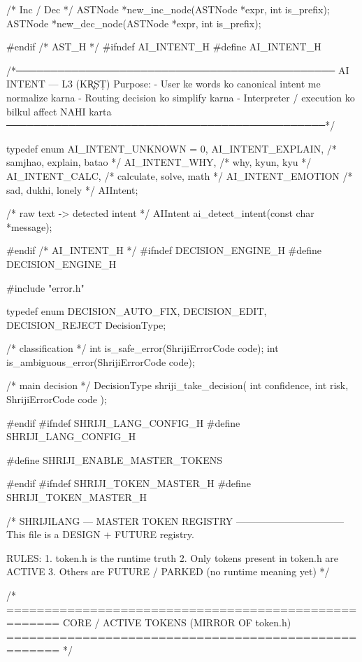 \documentclass{article}
\begin{document}
/* Inc / Dec */
ASTNode *new_inc_node(ASTNode *expr, int is_prefix);
ASTNode *new_dec_node(ASTNode *expr, int is_prefix);

#endif /* AST_H */
#ifndef AI_INTENT_H
#define AI_INTENT_H

/*──────────────────────────────────────────────
  AI INTENT — L3 (KR̥ṢṬ)
  Purpose:
  - User ke words ko canonical intent me normalize karna
  - Routing decision ko simplify karna
  - Interpreter / execution ko bilkul affect NAHI karta
──────────────────────────────────────────────*/

typedef enum {
    AI_INTENT_UNKNOWN = 0,
    AI_INTENT_EXPLAIN,   /* samjhao, explain, batao */
    AI_INTENT_WHY,       /* why, kyun, kyu */
    AI_INTENT_CALC,      /* calculate, solve, math */
    AI_INTENT_EMOTION    /* sad, dukhi, lonely */
} AIIntent;

/* raw text -> detected intent */
AIIntent ai_detect_intent(const char *message);

#endif /* AI_INTENT_H */
#ifndef DECISION_ENGINE_H
#define DECISION_ENGINE_H

#include "error.h"

typedef enum {
    DECISION_AUTO_FIX,
    DECISION_EDIT,
    DECISION_REJECT
} DecisionType;

/* classification */
int is_safe_error(ShrijiErrorCode code);
int is_ambiguous_error(ShrijiErrorCode code);

/* main decision */
DecisionType shriji_take_decision(
    int confidence,
    int risk,
    ShrijiErrorCode code
);

#endif
#ifndef SHRIJI_LANG_CONFIG_H
#define SHRIJI_LANG_CONFIG_H

#define SHRIJI_ENABLE_MASTER_TOKENS

#endif
#ifndef SHRIJI_TOKEN_MASTER_H
#define SHRIJI_TOKEN_MASTER_H

/*
  SHRIJILANG — MASTER TOKEN REGISTRY
  ---------------------------------
  This file is a DESIGN + FUTURE registry.

  RULES:
  1. token.h is the runtime truth
  2. Only tokens present in token.h are ACTIVE
  3. Others are FUTURE / PARKED (no runtime meaning yet)
*/

/* =====================================================
   CORE / ACTIVE TOKENS (MIRROR OF token.h)
   ===================================================== */
\end{document}
